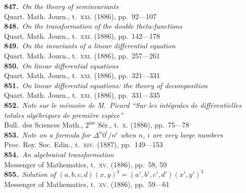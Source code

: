 \documentclass[11pt,a4paper]{article}
\providecommand{\textsc}[1]{{\scshape #1}}
\begin{document}
\small
\noindent\textbf{847.}~\textit{On the theory of seminvariants}~\\
\hspace*{2em}Quart. Math. Journ., t.~\textsc{xxi}. (1886), pp.~92---107\\[0.3em]
\textbf{848.}~\textit{On the transformation of the double theta-functions}~\\
\hspace*{2em}Quart. Math. Journ., t.~\textsc{xxi}. (1886), pp.~142---178\\[0.3em]
\textbf{849.}~\textit{On the invariants of a linear differential equation}~\\
\hspace*{2em}Quart. Math. Journ., t.~\textsc{xxi}. (1886), pp.~257---261\\[0.3em]
\textbf{850.}~\textit{On linear differential equations}~\\
\hspace*{2em}Quart. Math. Journ., t.~\textsc{xxi}. (1886), pp.~321---331\\[0.3em]
\textbf{851.}~\textit{On linear differential equations: the theory of decomposition}~\\
\hspace*{2em}Quart. Math. Journ., t.~\textsc{xxi}. (1886), pp.~331---335\\[0.3em]
\textbf{852.}~\textit{Note sur le m\'emoire de M.~Picard ``Sur les int\'egrales de diff\'erentielles totales alg\'ebriques de premi\`ere esp\`ece''}~\\
\hspace*{2em}Bull.\ des Sciences Math., $2^{\text{me}}$ S\'er., t.~\textsc{x}. (1886), pp.~75---78\\[0.3em]
\textbf{853.}~\textit{Note on a formula for $\Delta^{n} 0^{i}/n^{i}$ when $n$, $i$ are very large numbers}~\\
\hspace*{2em}Proc. Roy. Soc. Edin., t.~\textsc{xiv}. (1887), pp.~149---153\\[0.3em]
\textbf{854.}~\textit{An algebraical transformation}~\\
\hspace*{2em}Messenger of Mathematics, t.~\textsc{xv}. (1886), pp.~58, 59\\[0.3em]
\textbf{855.}~\textit{Solution of $(a,b,c,d)(x,y)^{3} = (a',b',c',d')(x',y')^{3}$}~\\
\hspace*{2em}Messenger of Mathematics, t.~\textsc{xv}. (1886), pp.~59---61\\[0.3em]
\end{document}
